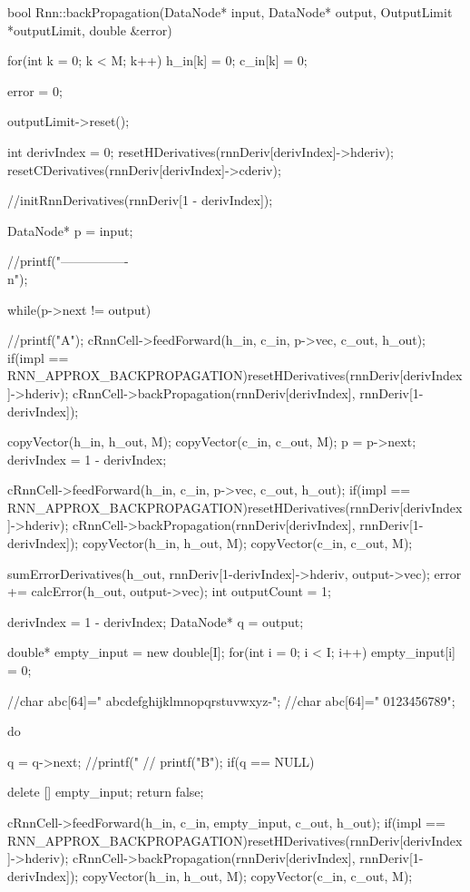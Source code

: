 bool Rnn::backPropagation(DataNode* input, DataNode* output, OutputLimit *outputLimit, double \&error){

  for(int k = 0; k < M; k++){
    h\_in[k] = 0;
    c\_in[k] = 0;
  }

  error = 0;

  outputLimit->reset();

  int derivIndex = 0;
  resetHDerivatives(rnnDeriv[derivIndex]->hderiv);
  resetCDerivatives(rnnDeriv[derivIndex]->cderiv);

  //initRnnDerivatives(rnnDeriv[1 - derivIndex]);

  DataNode* p = input;


//printf("----------------\\n");

  while(p->next != output){
    //printf("A");
    cRnnCell->feedForward(h\_in, c\_in, p->vec, c\_out, h\_out);
    if(impl == RNN\_APPROX\_BACKPROPAGATION)resetHDerivatives(rnnDeriv[derivIndex]->hderiv);
    cRnnCell->backPropagation(rnnDeriv[derivIndex], rnnDeriv[1-derivIndex]);

    copyVector(h\_in, h\_out, M);
    copyVector(c\_in, c\_out, M);
    p = p->next;
    derivIndex = 1 - derivIndex;
  }



  cRnnCell->feedForward(h\_in, c\_in, p->vec, c\_out, h\_out);
  if(impl == RNN\_APPROX\_BACKPROPAGATION)resetHDerivatives(rnnDeriv[derivIndex]->hderiv);
  cRnnCell->backPropagation(rnnDeriv[derivIndex], rnnDeriv[1-derivIndex]);
  copyVector(h\_in, h\_out, M);
  copyVector(c\_in, c\_out, M);

  sumErrorDerivatives(h\_out, rnnDeriv[1-derivIndex]->hderiv, output->vec);
  error += calcError(h\_out, output->vec);
  int outputCount = 1;


  derivIndex = 1 - derivIndex;
  DataNode* q = output;

  double* empty\_input = new double[I];
  for(int i = 0; i < I; i++)
   empty\_input[i] = 0;

   //char abc[64]=" abcdefghijklmnopqrstuvwxyz-";
   //char abc[64]=" 0123456789";

   do{

     q = q->next;
     //printf("%
    // printf("B");
     if(q == NULL) {

       delete [] empty\_input;
       return false;
     }

     cRnnCell->feedForward(h\_in, c\_in, empty\_input, c\_out, h\_out);
     if(impl == RNN\_APPROX\_BACKPROPAGATION)resetHDerivatives(rnnDeriv[derivIndex]->hderiv);
     cRnnCell->backPropagation(rnnDeriv[derivIndex], rnnDeriv[1-derivIndex]);
     copyVector(h\_in, h\_out, M);
     copyVector(c\_in, c\_out, M);

}}

